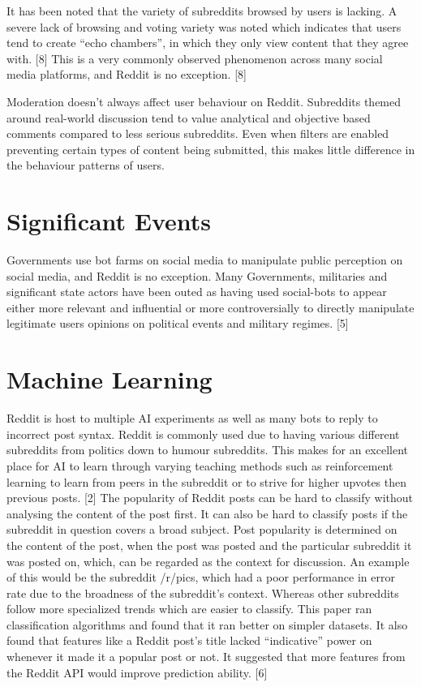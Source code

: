 It has been noted that the variety of subreddits browsed by users is lacking. A severe lack of browsing and voting variety was noted which indicates that users tend to create “echo chambers”, in which they only view content that they agree with. [8] This is a very commonly observed phenomenon across many social media platforms, and Reddit is no exception. [8]

Moderation doesn’t always affect user behaviour on Reddit. Subreddits themed around real-world discussion tend to value analytical and objective based comments compared to less serious subreddits. Even when filters are enabled preventing certain types of content being submitted, this makes little difference in the behaviour patterns of users.

\section{Significant Events}
Governments use bot farms on social media to manipulate public perception on social media, and Reddit is no exception. Many Governments, militaries and significant state actors have been outed as having used social-bots to appear either more relevant and influential or more controversially to directly manipulate legitimate users opinions on political events and military regimes. [5] 

\section{Machine Learning}
Reddit is host to multiple AI experiments as well as many bots to reply to incorrect post syntax. Reddit is commonly used due to having various different subreddits from politics down to humour subreddits. This makes for an excellent place for AI to learn through varying teaching methods such as reinforcement learning to learn from peers in the subreddit or to strive for higher upvotes then previous posts. [2]
The popularity of Reddit posts can be hard to classify without analysing the content of the post first. It can also be hard to classify posts if the subreddit in question covers a broad subject. Post popularity is determined on the content of the post, when the post was posted and the particular subreddit it was posted on, which, can be regarded as the context for discussion. An example of this would be the subreddit /r/pics, which had a poor performance in error rate due to the broadness of the subreddit’s context. Whereas other subreddits follow more specialized trends which are easier to classify. This paper ran classification algorithms and found that it ran better on simpler datasets. It also found that features like a Reddit post’s title lacked “indicative” power on whenever it made it a popular post or not. It suggested that more features from the Reddit API would improve prediction ability. [6]

